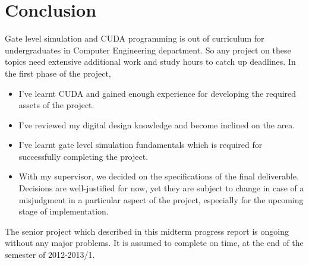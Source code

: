 \documentclass[a4paper,onesided,12pt]{report}
\begin{document}
\chapter{Conclusion}
\label{chapter:conclusion}

Gate level simulation and CUDA programming is out of curriculum for undergraduates in Computer Engineering department. So any project on these topics need extensive additional work and study hours to catch up deadlines. In the first phase of the project,
\begin{itemize}
\item I've learnt CUDA and gained enough experience for developing the required assets of the project.
\item I've reviewed my digital design knowledge and become inclined on the area.
\item I've learnt gate level simulation fundamentals which is required for successfully completing the project.
\item With my supervisor, we decided on the specifications of the final deliverable. Decisions are well-justified for now, yet they are subject to change in case of a misjudgment in a particular aspect of the project, especially for the upcoming stage of implementation.  
\end{itemize}
The senior project which described in this midterm progress report is ongoing without any major problems. It is assumed to complete on time, at the end of the semester of 2012-2013/1.


%













\appendix



\end{document}

